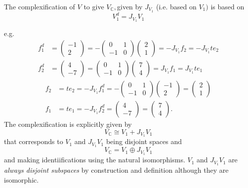 \documentclass[aps,preprint]{revtex4}
\begin{document}
The complexification of $V$ to give $V_{\mathbb{C}},$given by $J_{V_{1}}$
(i.e. based on $V_{1})$ is based on 
\begin{equation}
V_{1}^{d}=J_{V_{1}}V_{1}
\end{equation}

e.g. 
\begin{align}
f_{1}^{d} & =\left( 
\begin{array}{c}
-1 \\ 
2%
\end{array}
\right) =-\left( 
\begin{array}{cc}
0 & 1 \\ 
-1 & 0%
\end{array}
\right) \left( 
\begin{array}{c}
2 \\ 
1%
\end{array}
\right) =-J_{V_{1}}f_{2}=-J_{V_{1}}te_{2} \\
f_{2}^{d} & =\left( 
\begin{array}{c}
4 \\ 
-7%
\end{array}
\right) =\left( 
\begin{array}{cc}
0 & 1 \\ 
-1 & 0%
\end{array}
\right) \left( 
\begin{array}{c}
7 \\ 
4%
\end{array}
\right) =J_{V_{1}}f_{1}=J_{V_{1}}te_{1}
\end{align}%
\begin{align}
f_{2} & =te_{2}=-J_{V_{1}}f_{1}^{d}=-\left( 
\begin{array}{cc}
0 & 1 \\ 
-1 & 0%
\end{array}
\right) \left( 
\begin{array}{c}
-1 \\ 
2%
\end{array}
\right) =\left( 
\begin{array}{c}
2 \\ 
1%
\end{array}
\right) \\
f_{1} & =te_{1}=-J_{V_{1}}f_{2}^{d}=\left( 
\begin{array}{c}
4 \\ 
-7%
\end{array}
\right) =\left( 
\begin{array}{c}
7 \\ 
4%
\end{array}
\right) .
\end{align}
The complexification is explicitly given by 
\begin{equation}
V_{\mathbb{C}}\cong V_{1}+J_{V_{1}}V_{1}
\end{equation}
that corresponds to $V_{1}$ and $J_{V_{1}}V_{1}$ being disjoint spaces and 
\begin{equation}
V_{\mathbb{C}}=V_{1}\oplus J_{V_{1}}V_{1}
\end{equation}
and making identiifications using the natural isomorphisms. $V_{1}$ and $%
J_{V_{1}}V_{1}$ are \emph{always disjoint subspaces }by construction and
definition although they are isomorphic.
\end{document}
